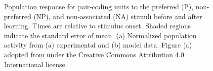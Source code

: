 \begin{figure}
    \centering

    \vspace*{.75cm}
    \caption[Population response for pair-coding units.]{Population response for pair-coding units to the preferred (P), non-preferred (NP), and non-associated (NA) stimuli before and after learning. Times are relative to stimulus onset. Shaded regions indicate the standard error of mean. (a) Normalized population activity from (a) experimental and (b) model data. Figure (a) adopted from \textcite{ison2015} under the Creative Commons Attribution 4.0 International license.}\label{fig:aml-population-response}
\end{figure}


